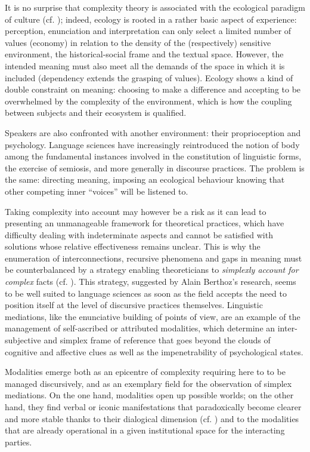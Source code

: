 \documentclass[output=paper]{langscibook}
\begin{document}
It is no surprise that complexity theory is associated with the ecological paradigm of culture (cf. ); indeed, ecology is rooted in a rather basic aspect of experience: perception, enunciation and interpretation can only select a limited number of values (economy) in relation to the density of the (respectively) sensitive environment, the historical-social frame and the textual space. However, the intended meaning must also meet all the demands of the space in which it is included (dependency extends the grasping of values). Ecology shows a kind of double constraint on meaning: choosing to make a difference and accepting to be overwhelmed by the complexity of the environment, which is how the coupling between subjects and their ecosystem is qualified. 

Speakers are also confronted with another environment: their proprioception and psychology. Language sciences have increasingly reintroduced the notion of body among the fundamental instances involved in the constitution of linguistic forms, the exercise of semiosis, and more generally in discourse practices. The problem is the same: directing meaning, imposing an ecological behaviour knowing that other competing inner “voices” will be listened to.\largerpage

Taking complexity into account may however be a risk as it can lead to presenting an unmanageable framework for theoretical practices, which have difficulty dealing with indeterminate aspects and cannot be satisfied with solutions whose relative effectiveness remains unclear. This is why the enumeration of interconnections, recursive phenomena and gaps in meaning must be counterbalanced by a strategy enabling theoreticians to \textit{simplexly account for complex} facts (cf. ). This strategy, suggested by Alain Berthoz's research, seems to be well suited to language sciences as soon as the field accepts the need to position itself at the level of discursive practices themselves. Linguistic mediations, like the enunciative building of points of view, are an example of the management of self-ascribed or attributed modalities, which determine an inter-subjective and simplex frame of reference that goes beyond the clouds of cognitive and affective clues as well as the impenetrability of psychological states.

Modalities emerge both as an epicentre of complexity requiring here to to be managed discursively, and as an exemplary field for the observation of simplex mediations. On the one hand, modalities open up possible worlds; on the other hand, they find verbal or iconic manifestations that paradoxically become clearer and more stable thanks to their dialogical dimension (cf. ) and to the modalities that are already operational in a given institutional space for the interacting parties. 
\end{document}

